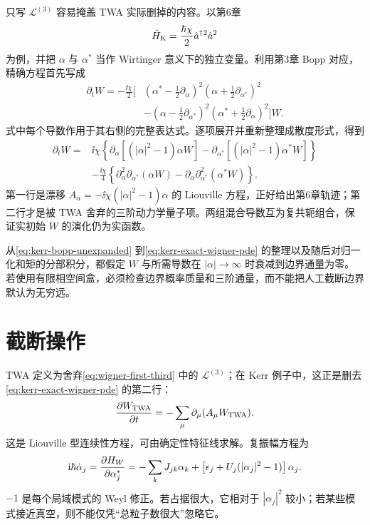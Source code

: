 只写 $\mathcal L^{(3)}$ 容易掩盖 TWA 实际删掉的内容。以第6章
\begin{equation}
  \hat H_{\mathrm K}=\frac{\hbar\chi}{2}\hat a^{\dagger}{}^2\hat a^2
\end{equation}
为例，并把 $\alpha$ 与 $\alpha^*$ 当作 Wirtinger 意义下的独立变量。利用第3章 Bopp 对应，精确方程首先写成
\begin{align}
  \partial_tW=-\frac{\ii\chi}{2}\Bigg[&
  \left(\alpha^*-\frac12\partial_\alpha\right)^2
  \left(\alpha+\frac12\partial_{\alpha^*}\right)^2
  \nonumber\\[-1mm]
  &-\left(\alpha-\frac12\partial_{\alpha^*}\right)^2
  \left(\alpha^*+\frac12\partial_\alpha\right)^2
  \Bigg]W .
  \label{eq:kerr-bopp-unexpanded}
\end{align}
式中每个导数作用于其右侧的完整表达式。逐项展开并重新整理成散度形式，得到
\begin{align}
  \partial_tW={}&\ii\chi\left\{
  \partial_\alpha\!\left[(|\alpha|^2-1)\alpha W\right]
  -\partial_{\alpha^*}\!\left[(|\alpha|^2-1)\alpha^*W\right]
  \right\}
  \nonumber\\
  &-\frac{\ii\chi}{4}\left\{
  \partial_\alpha^2\partial_{\alpha^*}(\alpha W)
  -\partial_\alpha\partial_{\alpha^*}^2(\alpha^*W)
  \right\}.
  \label{eq:kerr-exact-wigner-pde}
\end{align}
第一行是漂移 $A_\alpha=-\ii\chi(|\alpha|^2-1)\alpha$ 的 Liouville 方程，正好给出第6章轨迹；第二行才是被 TWA 舍弃的三阶动力学量子项。两组混合导数互为复共轭组合，保证实初始 $W$ 的演化仍为实函数。

从\cref{eq:kerr-bopp-unexpanded} 到\cref{eq:kerr-exact-wigner-pde} 的整理以及随后对归一化和矩的分部积分，都假定 $W$ 与所需导数在 $|\alpha|\to\infty$ 时衰减到边界通量为零。若使用有限相空间盒，必须检查边界概率质量和三阶通量，而不能把人工截断边界默认为无穷远。

\section{截断操作}

TWA 定义为舍弃\cref{eq:wigner-first-third} 中的 $\mathcal{L}^{(3)}$；在 Kerr 例子中，这正是删去\cref{eq:kerr-exact-wigner-pde} 的第二行：
\begin{equation}
  \frac{\partial W_{\mathrm{TWA}}}{\partial t}
  =-\sum_\mu\partial_\mu(A_\mu W_{\mathrm{TWA}}).
  \label{eq:twa-liouville}
\end{equation}
这是 Liouville 型连续性方程，可由确定性特征线求解。复振幅方程为
\begin{equation}
  \mathrm{i}\hbar\dot\alpha_j
  =\frac{\partial H_W}{\partial \alpha_j^*}
  =-\sum_kJ_{jk}\alpha_k
  +\left[\epsilon_j+U_j(|\alpha_j|^2-1)\right]\alpha_j.
  \label{eq:twa-bose-hubbard-drift}
\end{equation}
$-1$ 是每个局域模式的 Weyl 修正。若占据很大，它相对于 $|\alpha_j|^2$ 较小；若某些模式接近真空，则不能仅凭“总粒子数很大”忽略它。

